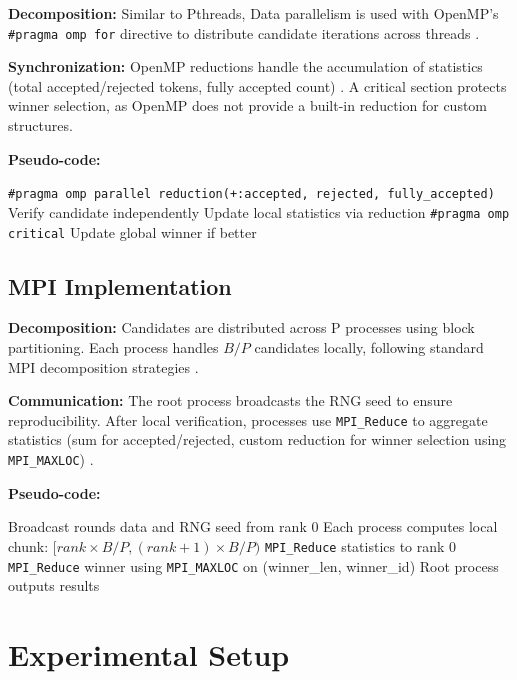 \documentclass[conference]{IEEEtran}
\begin{document}
\textbf{Decomposition:} Similar to Pthreads, Data parallelism is used with OpenMP's \texttt{\#pragma omp for} directive to distribute candidate iterations across threads \cite{chapman2007}.

\textbf{Synchronization:} OpenMP reductions handle the accumulation of statistics (total accepted/rejected tokens, fully accepted count) \cite{chapman2007,openmp2018}. A critical section protects winner selection, as OpenMP does not provide a built-in reduction for custom structures.

\textbf{Pseudo-code:}
\begin{algorithmic}
\STATE \texttt{\#pragma omp parallel reduction(+:accepted, rejected, fully\_accepted)}
    \STATE Verify candidate independently
    \STATE Update local statistics via reduction
    \STATE \texttt{\#pragma omp critical}
    \STATE Update global winner if better
\ENDFOR
\end{algorithmic}

\subsection{MPI Implementation}

\textbf{Decomposition:} Candidates are distributed across P processes using block partitioning. Each process handles $B/P$ candidates locally, following standard MPI decomposition strategies \cite{gropp2014,snir1998}.

\textbf{Communication:} The root process broadcasts the RNG seed to ensure reproducibility. After local verification, processes use \texttt{MPI\_Reduce} to aggregate statistics (sum for accepted/rejected, custom reduction for winner selection using \texttt{MPI\_MAXLOC}) \cite{gropp2014,snir1998}.

\textbf{Pseudo-code:}
\begin{algorithmic}
\STATE Broadcast rounds data and RNG seed from rank 0
\STATE Each process computes local chunk: $[rank \times B/P, (rank+1) \times B/P)$
\STATE \texttt{MPI\_Reduce} statistics to rank 0
\STATE \texttt{MPI\_Reduce} winner using \texttt{MPI\_MAXLOC} on (winner\_len, winner\_id)
\STATE Root process outputs results
\end{algorithmic}

\section{Experimental Setup}
\label{sec:experimental}
\end{document}
